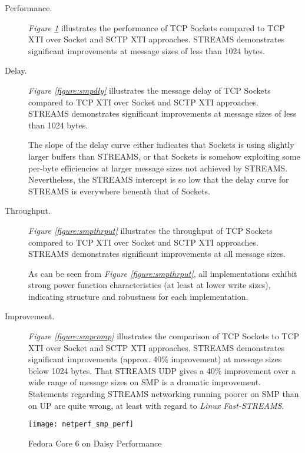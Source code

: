 \documentclass[letterpaper,final,notitlepage,twocolumn,10pt,twoside]{article}
\begin{document}
\begin{description}

\item[Performance.]

\textit{Figure \ref{figure:smpperf}} illustrates the performance of TCP Sockets compared to TCP XTI
over Socket and SCTP XTI approaches.  STREAMS demonstrates significant improvements at message sizes
of less than 1024 bytes.

\item[Delay.]

\textit{Figure \ref{figure:smpdly}} illustrates the message delay of TCP Sockets compared to TCP XTI
over Socket and SCTP XTI approaches.  STREAMS demonstrates significant improvements at message sizes
of less than 1024 bytes.

The slope of the delay curve either indicates that Sockets is using slightly larger buffers than
STREAMS, or that Sockets is somehow exploiting some per-byte efficiencies at larger message sizes
not achieved by STREAMS.  Nevertheless, the STREAMS intercept is so low that the delay curve for
STREAMS is everywhere beneath that of Sockets.

\item[Throughput.]

\textit{Figure \ref{figure:smpthrput}} illustrates the throughput of TCP Sockets compared to TCP XTI
over Socket and SCTP XTI approaches.  STREAMS demonstrates significant improvements at all message
sizes.

As can be seen from \textit{Figure \ref{figure:smpthrput}}, all implementations exhibit strong power
function characteristics (at least at lower write sizes), indicating structure and robustness for
each implementation.

\item[Improvement.]

\textit{Figure \ref{figure:smpcomp}} illustrates the comparison of TCP Sockets to TCP XTI over
Socket and SCTP XTI approaches.  STREAMS demonstrates significant improvements (approx. 40\%
improvement) at message sizes below 1024 bytes.  That STREAMS UDP gives a 40\% improvement over a
wide range of message sizes on SMP is a dramatic improvement.  Statements regarding STREAMS
networking running poorer on SMP than on UP are quite wrong, at least with regard to \textsl{Linux
Fast-STREAMS}.

\end{description}

\begin{figure}[p]
\center\texttt{[image: netperf\_smp\_perf]}
\caption[Fedora Core 6 on Daisy Performance]{Fedora Core 6 on Daisy Performance}
\label{figure:smpperf}
\end{figure}
\end{document}
